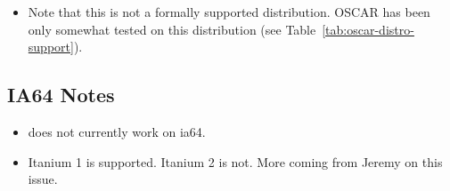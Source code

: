 \begin{itemize}
\item Note that this is not a formally supported distribution.  OSCAR
  \oscarversion has been only somewhat tested on this distribution
  (see Table~\ref{tab:oscar-distro-support}).
\end{itemize}


\subsection{IA64 Notes}
\label{subsec:ia64notes}

\begin{itemize}
\item {} does not currently work on ia64.

\item Itanium 1 is supported.  Itanium 2 is not.  More coming from
  Jeremy on this issue.
\end{itemize}
